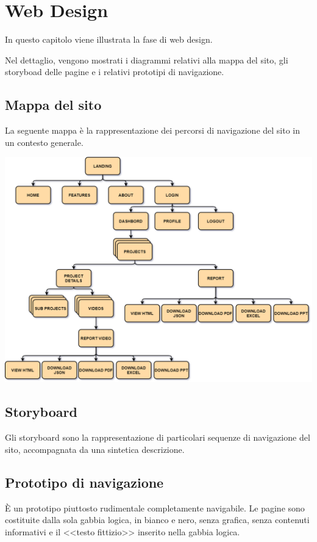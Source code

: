 
\chapter{Web Design}\label{chap:web-design}
In questo capitolo viene illustrata la fase di web design.

Nel dettaglio, vengono mostrati i diagrammi relativi alla mappa del sito, gli 
storyboad delle pagine e i relativi prototipi di navigazione.

\section{Mappa del sito}\label{sec:mappa-sito}
La seguente mappa è la rappresentazione dei percorsi di navigazione del sito in 
un contesto generale.

\includegraphics[width=\linewidth]{images/mappa-sito.png}

\section{Storyboard}\label{sec:storyboard}
Gli storyboard sono la rappresentazione di particolari sequenze di navigazione 
del sito, accompagnata da una sintetica descrizione.



\section{Prototipo di navigazione}\label{sec:prototipo-navigazione}
È un prototipo piuttosto rudimentale completamente navigabile. Le pagine sono 
costituite dalla sola gabbia logica, in bianco e nero, senza grafica, senza 
contenuti informativi e il <<testo fittizio>> inserito nella gabbia logica.


